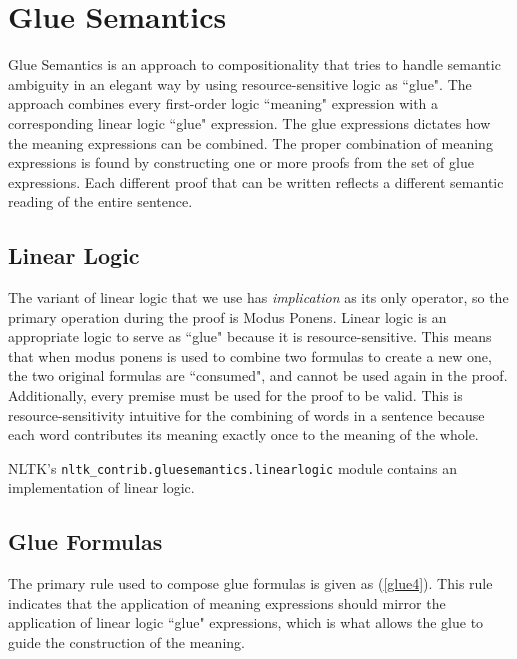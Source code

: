 \documentclass[11pt]{article}
\newcommand{\dhgcode}[1]{{\tt #1}}
\begin{document}
\section{Glue Semantics}
Glue Semantics is an approach to compositionality that tries to handle semantic ambiguity in an elegant way by using resource-sensitive logic as ``glue".  The approach combines every first-order logic ``meaning" expression with a corresponding linear logic ``glue" expression.  The glue expressions dictates how the meaning expressions can be combined.  The proper combination of meaning expressions is found by constructing one or more proofs from the set of glue expressions.  Each different proof that can be written reflects a different semantic reading of the entire sentence.  

\subsection{Linear Logic}
The variant of linear logic that we use has \emph{implication} as its only operator, so the primary operation during the proof is Modus Ponens.  Linear logic is an appropriate logic to serve as ``glue" because it is resource-sensitive.  This means that when modus ponens is used to combine two formulas to create a new one, the two original formulas are ``consumed", and cannot be used again in the proof.  Additionally, every premise must be used for the proof to be valid.  This is resource-sensitivity intuitive for the combining of words in a sentence because each word contributes its meaning exactly once to the meaning of the whole.


NLTK's \dhgcode{nltk\_contrib.gluesemantics.linearlogic} module contains an implementation of linear logic.

\subsection{Glue Formulas}
The primary rule used to compose glue formulas is given as (\ref{glue4}).  This rule indicates that the application of meaning expressions should mirror the application of linear logic ``glue" expressions, which is what allows the glue to guide the construction of the meaning.

\end{document}
